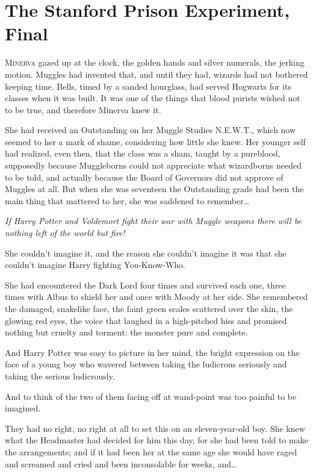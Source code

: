 \chapter{The Stanford Prison Experiment, Final}

\lettrine{M}{inerva} gazed up at the clock, the golden hands and silver numerals, the jerking motion. Muggles had invented that, and until they had, wizards had not bothered keeping time. Bells, timed by a sanded hourglass, had served Hogwarts for its classes when it was built. It was one of the things that blood purists wished not to be true, and therefore Minerva knew it.

She had received an Outstanding on her Muggle Studies N.E.W.T., which now seemed to her a mark of shame, considering how little she knew. Her younger self had realized, even then, that the class was a sham, taught by a pureblood, supposedly because Muggleborns could not appreciate what wizardborns needed to be told, and actually because the Board of Governors did not approve of Muggles at all. But when she was seventeen the Outstanding grade had been the main thing that mattered to her, she was saddened to remember…

\emph{If Harry Potter and Voldemort fight their war with Muggle weapons there will be nothing left of the world but fire!}

She couldn’t imagine it, and the reason she couldn’t imagine it was that she couldn’t imagine Harry fighting You-Know-Who.

She had encountered the Dark Lord four times and survived each one, three times with Albus to shield her and once with Moody at her side. She remembered the damaged, snakelike face, the faint green scales scattered over the skin, the glowing red eyes, the voice that laughed in a high-pitched hiss and promised nothing but cruelty and torment: the monster pure and complete.

And Harry Potter was easy to picture in her mind, the bright expression on the face of a young boy who wavered between taking the ludicrous seriously and taking the serious ludicrously.

And to think of the two of them facing off at wand-point was too painful to be imagined.

They had no right, no right at all to set this on an eleven-year-old boy. She knew what the Headmaster had decided for him this day, for she had been told to make the arrangements; and if it had been her at the same age she would have raged and screamed and cried and been inconsolable for weeks, and…

